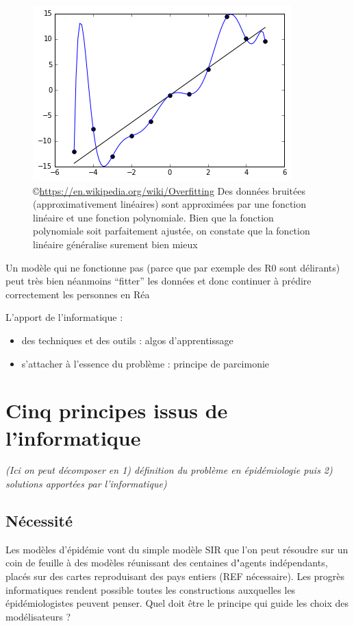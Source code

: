 \documentclass[review]{elsarticle}
\begin{document}
\begin{figure}[h]
  \includegraphics[width=0.8\linewidth]{Overfitted_Data.png}  
  \centering
  \caption{\copyright \href{wikipedia}{https://en.wikipedia.org/wiki/Overfitting}  Des données bruitées (approximativement linéaires) sont approximées par une fonction linéaire et une fonction polynomiale. Bien que la fonction polynomiale soit parfaitement ajustée, on constate que la fonction linéaire généralise surement bien mieux}
  \label{fig:overfitting}
\end{figure}


Un modèle qui ne fonctionne pas (parce que par exemple des R0 sont délirants) peut très bien néanmoins ``fitter'' les données  et donc continuer à prédire correctement les personnes en Réa


L'apport de l'informatique :
\begin{itemize}
\item des techniques et des outils : algos d'apprentissage
\item s'attacher à l'essence du problème : principe de parcimonie
\end{itemize}

\section{Cinq principes issus de l'informatique}

\textit{(Ici on peut décomposer en 1) définition du problème en épidémiologie puis 2) solutions apportées par l'informatique)}

\subsection{Nécessité}

Les modèles d'épidémie vont du simple modèle SIR que l'on peut résoudre sur un coin de feuille à des modèles réunissant des centaines d"agents indépendants, placés sur des cartes reproduisant des pays entiers (REF nécessaire). Les progrès informatiques rendent possible toutes les constructions auxquelles les épidémiologistes peuvent penser. Quel doit être le principe qui guide les choix des modélisateurs ? 
\end{document}

